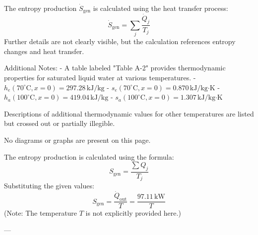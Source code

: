 The entropy production \( \dot{S}_{\text{gen}} \) is calculated using the heat transfer process:  
\[
\dot{S}_{\text{gen}} = \sum_j \frac{\dot{Q}_j}{T_j}
\]  
Further details are not clearly visible, but the calculation references entropy changes and heat transfer.  

Additional Notes:  
- A table labeled "Table A-2" provides thermodynamic properties for saturated liquid water at various temperatures.  
  - \( h_e(70^\circ\text{C}, x=0) = 297.28 \, \text{kJ/kg} \)  
  - \( s_e(70^\circ\text{C}, x=0) = 0.870 \, \text{kJ/kg·K} \)  
  - \( h_a(100^\circ\text{C}, x=0) = 419.04 \, \text{kJ/kg} \)  
  - \( s_a(100^\circ\text{C}, x=0) = 1.307 \, \text{kJ/kg·K} \)  

Descriptions of additional thermodynamic values for other temperatures are listed but crossed out or partially illegible.  

No diagrams or graphs are present on this page.

The entropy production is calculated using the formula:  
\[
S_{\text{gen}} = \frac{\sum Q_j}{T_j}
\]  
Substituting the given values:  
\[
S_{\text{gen}} = \frac{\dot{Q}_{\text{out}}}{T} = \frac{97.11 \, \text{kW}}{T}
\]  
(Note: The temperature \( T \) is not explicitly provided here.)

---
